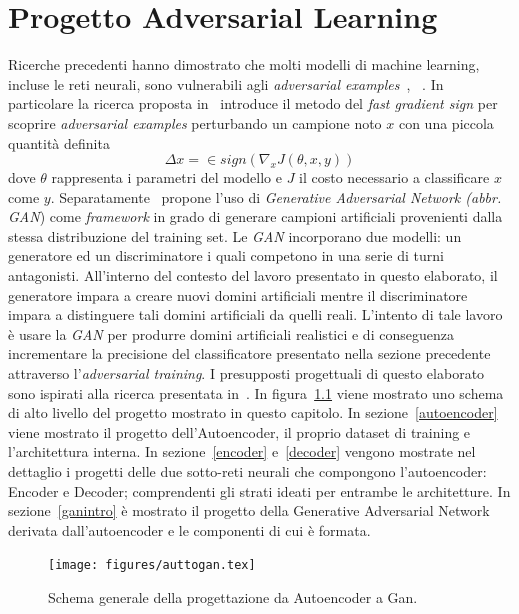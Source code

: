 \chapter{Progetto Adversarial Learning}
\label{adv}
Ricerche precedenti hanno dimostrato che molti modelli di machine learning, incluse le reti neurali, sono vulnerabili agli \textit{adversarial examples}~\cite{1312.6199}, ~\cite{1412.6572}. In particolare la ricerca proposta in~\cite{1412.6572} introduce il metodo del \textit{fast gradient sign} per scoprire \textit{adversarial examples} perturbando un campione noto $x$ con una piccola quantità definita  
\[\Delta x =  \in sign(\nabla_x J(\theta,x,y))\] 
dove $\theta$ rappresenta i parametri del modello e $J$ il costo necessario a classificare $x$ come $y$.
Separatamente~\cite{1406.2661} propone l'uso di \textit{Generative Adversarial Network (abbr. GAN})  come \textit{framework} in grado di generare campioni artificiali provenienti dalla stessa distribuzione del training set.
Le \textit{GAN} incorporano due modelli: un generatore ed un discriminatore i quali competono in una serie di turni antagonisti. All'interno del contesto del lavoro presentato in questo elaborato, il generatore impara a creare nuovi domini artificiali mentre il discriminatore impara a distinguere tali domini artificiali da quelli reali. L'intento di tale lavoro è usare la \textit{GAN} per produrre domini artificiali realistici e di conseguenza incrementare la precisione del classificatore presentato nella sezione precedente attraverso l'\textit{adversarial training}. I presupposti progettuali di questo elaborato sono ispirati alla ricerca presentata in~\cite{deepdga}. In figura~\ref{fig:auttogan} viene mostrato uno schema di alto livello del progetto mostrato in questo capitolo.
In sezione~\ref{autoencoder} viene mostrato il progetto dell'Autoencoder, il proprio dataset di training e l'architettura interna. In sezione~\ref{encoder} e~\ref{decoder} vengono mostrate nel dettaglio i progetti delle due sotto-reti neurali che compongono l'autoencoder: Encoder e Decoder; comprendenti gli strati ideati per entrambe le architetture. 
In sezione~\ref{ganintro} è mostrato il progetto della Generative Adversarial Network derivata dall'autoencoder e le componenti di cui è formata.

\begin{figure}[htbp]
    \centering 
	\texttt{[image: figures/auttogan.tex]}
	\caption{Schema generale della progettazione da Autoencoder a Gan. \label{fig:auttogan}}
\end{figure}


